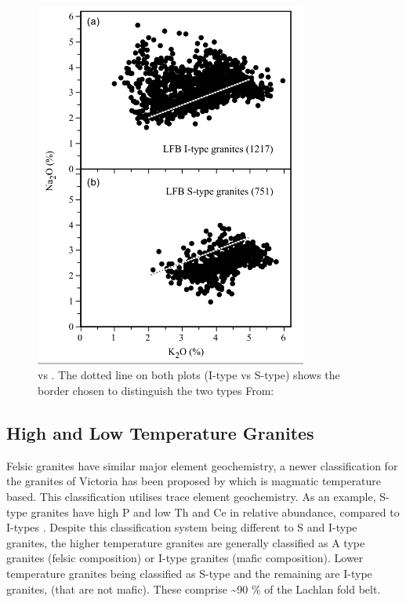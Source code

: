 \documentclass[a4paper]{article}
\begin{document}
\begin{figure}[H]
\centering
\includegraphics[width=0.8\textwidth]{SodiumPotassium.jpg}
\caption{\label{fig:SodiumPotassium}  vs . The dotted line on both plots (I-type vs S-type) shows the border chosen to distinguish the two types  From: \cite{chappell2001two}}
\end{figure}

\subsection{High and Low Temperature Granites}
Felsic granites have similar major element geochemistry, a newer classification for the granites of Victoria has been proposed by \cite{chappell2010high} which is magmatic temperature based. This classification utilises trace element geochemistry. As an example, S-type granites have high P and low Th and Ce in relative abundance, compared to I-types \cite{chappell1998high}. Despite this classification system being different to S and I-type granites, the higher temperature granites are generally classified as A type granites (felsic composition) or I-type granites (mafic composition). Lower temperature granites being classified as S-type and the remaining are I-type granites, (that are not mafic). These comprise \textasciitilde 90 \% of the Lachlan fold belt. \cite{chappell2001two}
\end{document}
